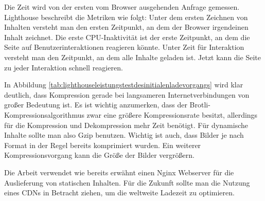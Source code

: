 Die Zeit wird von der ersten vom Browser ausgehenden Anfrage gemessen.
Lighthouse beschreibt die Metriken wie folgt: Unter dem ersten Zeichnen
von Inhalten versteht man den ersten Zeitpunkt, an dem der Browser
irgendeinen Inhalt zeichnet. Die erste CPU-Inaktivität ist
der erste Zeitpunkt, an dem die Seite auf Benutzerinteraktionen reagieren könnte.
Unter Zeit für Interaktion versteht man den Zeitpunkt, an dem alle Inhalte geladen ist.
Jetzt kann die Seite zu jeder Interaktion schnell reagieren.\cite{WhatPerformanceMetricsMeasure}

In Abbildung \ref{tab:lighthouseleistungstestdesinitialenladevorgangs} wird klar deutlich,
dass Kompression gerade bei langsameren Internetverbindungen von großer Bedeutung ist.
Es ist wichtig anzumerken, dass der Brotli-Kompressionsalgorithmus zwar eine größere
Kompressionsrate besitzt, allerdings für die Kompression und Dekompression mehr Zeit
benötigt.\cite{CompressionBenchmark} Für dynamische Inhalte sollte man also Gzip
benutzen. Wichtig ist auch, dass Bilder je nach Format in der Regel bereits komprimiert wurden.
Ein weiterer Kompressionsvorgang kann die Größe der Bilder vergrößern.

Die Arbeit verwendet wie bereits erwähnt einen Nginx Webserver für die
Auslieferung von statischen Inhalten. Für die Zukunft sollte man die Nutzung
eines CDNs in Betracht ziehen, um die weltweite Ladezeit zu optimieren.

